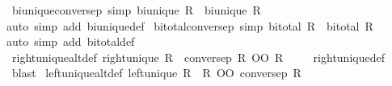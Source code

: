 \begin{isabellebody}
\endisatagproof
{\isafoldproof}%
%
\isadelimproof
\isanewline
%
\endisadelimproof
\isanewline
{}\isamarkupfalse%
\ bi{\isacharunderscore}{\kern0pt}unique{\isacharunderscore}{\kern0pt}conversep\ {\isacharbrackleft}{\kern0pt}simp{\isacharbrackright}{\kern0pt}{\isacharcolon}{\kern0pt}\ {\isachardoublequoteopen}bi{\isacharunderscore}{\kern0pt}unique\ R{\isasyminverse}{\isasyminverse}\ {\isacharequal}{\kern0pt}\ bi{\isacharunderscore}{\kern0pt}unique\ R{\isachardoublequoteclose}\isanewline
%
\isadelimproof
\ \ %
\endisadelimproof
%
\isatagproof
{}\isamarkupfalse%
{\isacharparenleft}{\kern0pt}auto\ simp\ add{\isacharcolon}{\kern0pt}\ bi{\isacharunderscore}{\kern0pt}unique{\isacharunderscore}{\kern0pt}def{\isacharparenright}{\kern0pt}%
\endisatagproof
{\isafoldproof}%
%
\isadelimproof
\isanewline
%
\endisadelimproof
\isanewline
{}\isamarkupfalse%
\ bi{\isacharunderscore}{\kern0pt}total{\isacharunderscore}{\kern0pt}conversep\ {\isacharbrackleft}{\kern0pt}simp{\isacharbrackright}{\kern0pt}{\isacharcolon}{\kern0pt}\ {\isachardoublequoteopen}bi{\isacharunderscore}{\kern0pt}total\ R{\isasyminverse}{\isasyminverse}\ {\isacharequal}{\kern0pt}\ bi{\isacharunderscore}{\kern0pt}total\ R{\isachardoublequoteclose}\isanewline
%
\isadelimproof
\ \ %
\endisadelimproof
%
\isatagproof
{}\isamarkupfalse%
{\isacharparenleft}{\kern0pt}auto\ simp\ add{\isacharcolon}{\kern0pt}\ bi{\isacharunderscore}{\kern0pt}total{\isacharunderscore}{\kern0pt}def{\isacharparenright}{\kern0pt}%
\endisatagproof
{\isafoldproof}%
%
\isadelimproof
\isanewline
%
\endisadelimproof
\isanewline
{}\isamarkupfalse%
\ right{\isacharunderscore}{\kern0pt}unique{\isacharunderscore}{\kern0pt}alt{\isacharunderscore}{\kern0pt}def{\isacharcolon}{\kern0pt}\ {\isachardoublequoteopen}right{\isacharunderscore}{\kern0pt}unique\ R\ {\isacharequal}{\kern0pt}\ {\isacharparenleft}{\kern0pt}conversep\ R\ OO\ R\ {\isasymle}\ {\isacharparenleft}{\kern0pt}{\isacharequal}{\kern0pt}{\isacharparenright}{\kern0pt}{\isacharparenright}{\kern0pt}{\isachardoublequoteclose}%
\isadelimproof
\ %
\endisadelimproof
%
\isatagproof
{}\isamarkupfalse%
\ right{\isacharunderscore}{\kern0pt}unique{\isacharunderscore}{\kern0pt}def\ \isamarkupfalse%
\ blast%
\endisatagproof
{\isafoldproof}%
%
\isadelimproof
%
\endisadelimproof
\isanewline
{}\isamarkupfalse%
\ left{\isacharunderscore}{\kern0pt}unique{\isacharunderscore}{\kern0pt}alt{\isacharunderscore}{\kern0pt}def{\isacharcolon}{\kern0pt}\ {\isachardoublequoteopen}left{\isacharunderscore}{\kern0pt}unique\ R\ {\isacharequal}{\kern0pt}\ {\isacharparenleft}{\kern0pt}R\ OO\ {\isacharparenleft}{\kern0pt}conversep\ R{\isacharparenright}{\kern0pt}\ {\isasymle}\ {\isacharparenleft}{\kern0pt}{\isacharequal}{\kern0pt}{\isacharparenright}{\kern0pt}{\isacharparenright}{\kern0pt}{\isachardoublequoteclose}%

\end{isabellebody}
